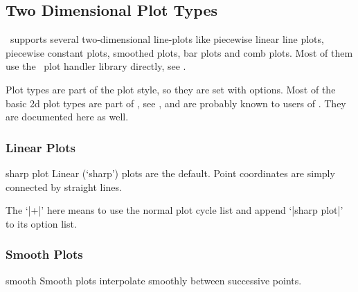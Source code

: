 
\subsection{Two Dimensional Plot Types}
{
%
\PGFPlots\ supports several two-dimensional line-plots like piecewise linear line plots, piecewise constant plots, smoothed plots, bar plots and comb plots. Most of them use the \PGF\ plot handler library directly, see \cite[section 18.8]{tikz}.

Plot types are part of the plot style, so they are set with options. Most of the basic 2d plot types are part of \Tikz, see \cite[section 18.8]{tikz}, and are probably known to users of \Tikz. They are documented here as well.


\subsubsection{Linear Plots}
\begin{plottype}{sharp plot}
Linear (`sharp') plots are the default. Point coordinates are simply connected by straight lines. 
\begin{codeexample}[]
\end{codeexample}

The `|+|' here means to use the normal plot cycle list and append `|sharp plot|' to its option list.
\end{plottype}

\subsubsection{Smooth Plots}
\begin{plottype}{smooth}
Smooth plots interpolate smoothly between successive points.
\begin{codeexample}[]
\end{codeexample}
\end{plottype}

}

